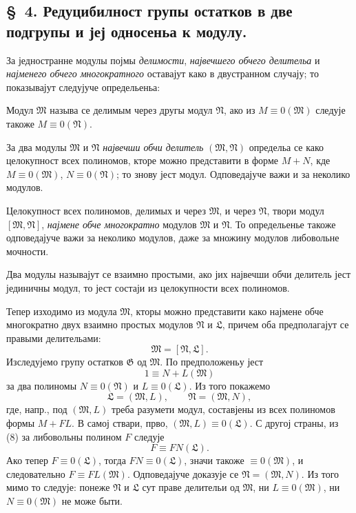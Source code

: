 ﻿\documentclass[11pt]{article}
\providecommand{\mM}{\mathfrak M}
\providecommand{\mN}{\mathfrak N}
\providecommand{\mL}{\mathfrak L}
\providecommand{\mG}{\mathfrak G}
\begin{document}

\setcounter{footnote}{10}
\subsection*{\S~4. Редуцибилност групы остатков в две подгрупы и јеј односеньа к модулу.}

За једностранне модулы појмы \textit{делимости}, \textit{највечшего обчего делительа} и \textit{најменего обчего многократного} оставајут како в двустранном случају; то показывајут следујуче определьеньа:

Модул \(\mM\) называ се делимым через другы модул \(\mN\), ако из \(M\equiv0(\mM)\) следује такоже \(M\equiv0(\mN)\).

За два модулы \(\mM\) и \(\mN\) \textit{највечши обчи делитель} \((\mM,\mN)\) определьа се како целокупност всех полиномов, кторе можно представити в форме \(M+N\), кде \(M\equiv0(\mM)\), \(N\equiv0(\mN)\); то знову јест модул. Одповедајуче важи и за неколико модулов.

Целокупност всех полиномов, делимых и через \(\mM\), и через \(\mN\), твори модул \([\mM,\mN]\), \textit{најмене обче многократно} модулов \(\mM\) и \(\mN\). То определьенье такоже одповедајуче важи за неколико модулов, даже за множину модулов либовольне мочности.

Два модулы называјут се взаимно простыми, ако јих највечши обчи делитель јест јединичны модул, то јест состаји из целокупности всех полиномов.

Тепер изходимо из модула \(\mM\), кторы можно представити како најмене обче многократно двух взаимно простых модулов \(\mN\) и \(\mL\), причем оба предполагајут се правыми делительами:
\begin{equation}
 \mM=[\mN,\mL].
\tag{7}
\end{equation}
Изследујемо групу остатков \(\mG\) од \(\mM\). По предположеньу јест
\begin{equation}
 1\equiv N+L(\mM)
\tag{8}
\end{equation}
за два полиномы \(N\equiv0(\mN)\) и \(L\equiv0(\mL)\). Из того покажемо
\begin{equation}
 \mL=(\mM,L),\qquad \mN=(\mM,N),
\tag{9}
\end{equation}
где, напр., под \((\mM,L)\) треба разумети модул, составјены из всех полиномов формы \(M+FL\). В самој ствари, прво, \((\mM,L)\equiv0(\mL)\). С другој страны, из (8) за либовольны полином \(F\) следује
\begin{equation}
 F\equiv FN(\mL).
\tag{10}
\end{equation}
Ако тепер \(F\equiv0(\mL)\), тогда \(FN\equiv0(\mL)\), значи такоже \(\equiv0(\mM)\), и следовательно \(F\equiv FL(\mM)\). Одповедајуче доказује се \(\mN=(\mM,N)\). Из того мимо то следује: понеже \(\mN\) и \(\mL\) сут праве делительи од \(\mM\), ни \(L\equiv0(\mM)\), ни \(N\equiv0(\mM)\) не може быти.
\end{document}

